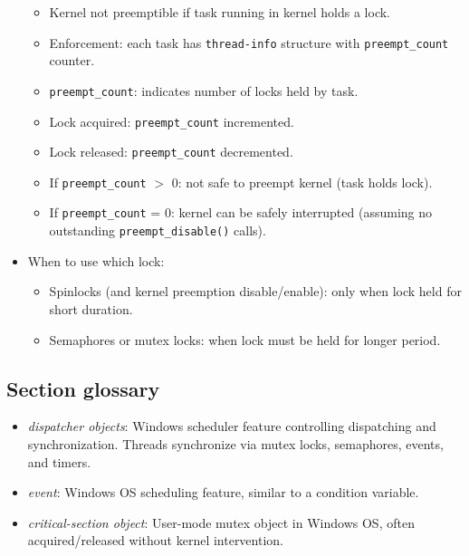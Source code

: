 \begin{itemize}
\begin{itemize}
        \item Kernel not preemptible if task running in kernel holds a lock.
        \item Enforcement: each task has \texttt{thread-info} structure with \texttt{preempt\_count} counter.
        \item \texttt{preempt\_count}: indicates number of locks held by task.
        \item Lock acquired: \texttt{preempt\_count} incremented.
        \item Lock released: \texttt{preempt\_count} decremented.
        \item If \texttt{preempt\_count} $>$ 0: not safe to preempt kernel (task holds lock).
        \item If \texttt{preempt\_count} = 0: kernel can be safely interrupted (assuming no outstanding \texttt{preempt\_disable()} calls).
    \end{itemize}
    \item When to use which lock:
    \begin{itemize}
        \item Spinlocks (and kernel preemption disable/enable): only when lock held for short duration.
        \item Semaphores or mutex locks: when lock must be held for longer period.
    \end{itemize}
\end{itemize}

\subsection{Section glossary}
\begin{itemize}
    \item \textit{dispatcher objects}: Windows scheduler feature controlling dispatching and synchronization. Threads synchronize via mutex locks, semaphores, events, and timers.
    \item \textit{event}: Windows OS scheduling feature, similar to a condition variable.
    \item \textit{critical-section object}: User-mode mutex object in Windows OS, often acquired/released without kernel intervention.
\end{itemize}
